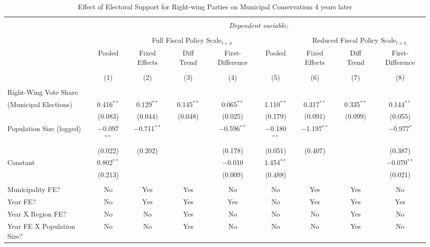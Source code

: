 \documentclass[a4paper,12pt]{article}
\begin{document}
\begin{landscape}
	
	
	\begin{table}[!htbp] \centering 
		\caption{Effect of Electoral Support for Right-wing Parties on Municipal Conservatism 4 years later} 
		\label{tab:FourYearLead} 
		\begin{tabular}{@{\extracolsep{5pt}}lcccccccc} 
			\\[-1.8ex]\hline 
			\hline \\[-1.8ex] 
			& \multicolumn{8}{c}{\textit{Dependent variable:}} \\ 
			\cline{2-9} 
			\\[-1.8ex] & & \multicolumn{3}{c}{Full Fiscal Policy Scale$_{t+4}$} & 	&\multicolumn{3}{c}{Reduced Fiscal Policy Scale$_{t+4}$}   \\ 
			& Pooled & Fixed Effects & Diff Trend & First-Difference & Pooled & Fixed Effects & Diff Trend & First-Difference \\ 
			\\[-1.8ex] & (1) & (2) & (3) & (4) & (5) & (6) & (7) & (8)\\ 
			\hline \\[-1.8ex] 
		Right-Wing Vote Share\\(Municipal Elections)  & 0.416$^{**}$ & 0.129$^{**}$ & 0.145$^{**}$ & 0.065$^{**}$  & 1.110$^{**}$ & 0.317$^{**}$ & 0.335$^{**}$ & 0.144$^{**}$ \\ 
			& (0.083) & (0.044) & (0.048) & (0.025)  & (0.179) & (0.091) & (0.099) &  (0.055) \\ 
			Population Size (logged) & $-$0.097$^{**}$ & $-$0.711$^{**}$ &  & $-$0.596$^{**}$  & $-$0.180$^{**}$ & $-$1.197$^{**}$ &  & $-$0.977$^{*}$ \\ 
			& (0.022) & (0.202) &  & (0.178)  & (0.051) & (0.407) &  &  (0.387) \\ 
			Constant & 0.802$^{**}$ &  &  & $-$0.010 & 1.454$^{**}$ &  &  & $-$0.070$^{**}$ \\ 
			& (0.213) &  &  & (0.009) & (0.488) &  &  & (0.021) \\ 
			\hline \\[-1.8ex]
			Municipality FE? & No & Yes & Yes & No & No & Yes & Yes & No \\ 
			Year FE? & No & Yes & Yes & Yes & No & Yes & Yes & Yes \\ 
			Year X Region FE? & No & No & Yes & No & No & No & Yes & No \\ 
			Year FE X Population Size? & No & No & Yes & No & No & No & Yes & No \\ 

\end{tabular}
\end{table}
\end{landscape}
\end{document}
